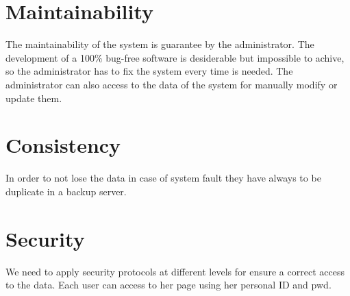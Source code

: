 \section{Maintainability}
The maintainability of the system is guarantee by the administrator. The development of a 100\% bug-free software is desiderable but impossible to achive, so the administrator has to fix the system every time is needed. The administrator can also access to the data of the system for manually modify or update them.

\section{Consistency}
In order to not lose the data in case of system fault they have always to be duplicate in a backup server.  

\section{Security}
We need to apply security protocols at different levels for ensure a correct access to the data. Each user can access to her page using her personal \gls{ID} and \gls{pwd}.
